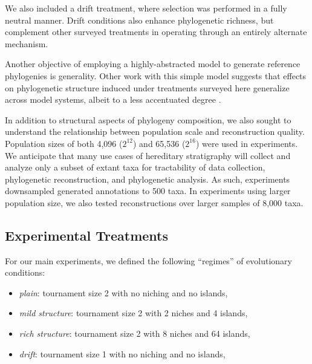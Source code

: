 We also included a drift treatment, where selection was performed in a fully neutral manner.
Drift conditions also enhance phylogenetic richness, but complement other surveyed treatments in operating through an entirely alternate mechanism.

Another objective of employing a highly-abstracted model to generate reference phylogenies is generality.
Other work with this simple model suggests that effects on phylogenetic structure induced under treatments surveyed here generalize across model systems, albeit to a less accentuated degree \citep{moreno2024ecology}.

In addition to structural aspects of phylogeny composition, we also sought to understand the relationship between population scale and reconstruction quality.
Population sizes of both 4,096 ($2^{12}$) and 65,536 ($2^{16}$) were used in experiments.
We anticipate that many use cases of hereditary stratigraphy will collect and analyze only a subset of extant taxa for tractability of data collection, phylogenetic reconstruction, and phylogenetic analysis.
As such, experiments downsampled generated annotations to 500 taxa.
In experiments using larger population size, we also tested reconstructions over larger samples of 8,000 taxa.

\subsection{Experimental Treatments}

For our main experiments, we defined the following ``regimes'' of evolutionary conditions:
\begin{itemize}
  \item \textit{plain}: tournament size 2 with no niching and no islands,
  \item \textit{mild structure}: tournament size 2 with 2 niches and 4 islands,
  \item \textit{rich structure}: tournament size 2 with 8 niches and 64 islands,
  \item \textit{drift}: tournament size 1 with no niching and no islands,
\end{itemize}


